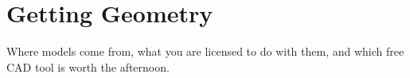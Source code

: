 
\chapter{Getting Geometry}

 Where models come from, what you are licensed to do
with them, and which free CAD tool is worth the afternoon.

